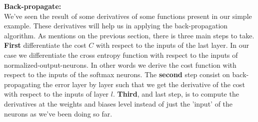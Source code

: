 			\vskip 1cm
			\textbf{Back-propagate:}\\
			We've seen the result of some derivatives of some functions present in our simple example. These derivatives will help us in applying the back-propagation algorithm. As mentions on the previous section, there is three main steps to take. \textbf{First} differentiate the cost $C$ with respect to the inputs of the last layer. In our case we differentiate the cross entropy function with respect to the inputs of normalized-output-neurons. In other words we derive the cost function with respect to the inputs of the softmax neurons. The \textbf{second} step consist on back-propagating the error layer by layer such that we get the derivative of the cost with respect to the inputs of layer $l$. \textbf{Third}, and last step, is to compute the derivatives at the weights and biases level instead of just the 'input' of the neurons as we've been doing so far.
